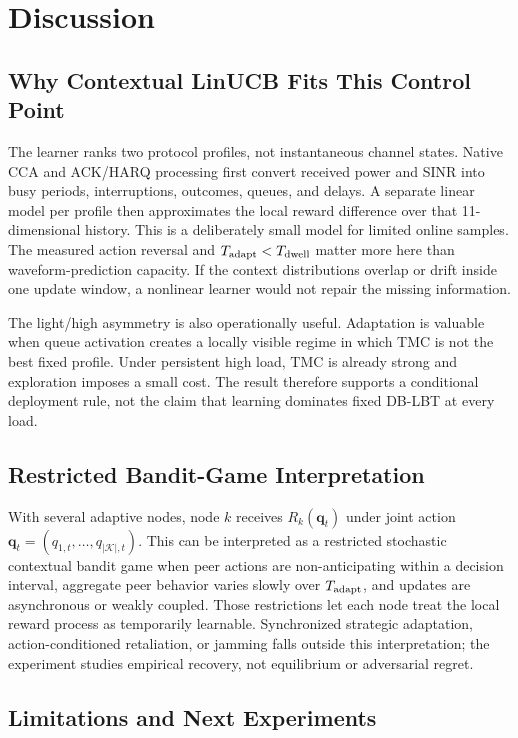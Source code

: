 \section{Discussion}
\label{sec:discussion}

\subsection{Why Contextual LinUCB Fits This Control Point}

The learner ranks two protocol profiles, not instantaneous channel states.
Native CCA and ACK/HARQ processing first convert received power and SINR into
busy periods, interruptions, outcomes, queues, and delays. A separate linear
model per profile then approximates the local reward difference over that
11-dimensional history. This is a deliberately small model for limited online
samples. The measured action reversal and
$T_{\rm adapt}<T_{\rm dwell}$ matter more here than waveform-prediction
capacity. If the context distributions overlap or drift inside one update
window, a nonlinear learner would not repair the missing information.

The light/high asymmetry is also operationally useful. Adaptation is valuable
when queue activation creates a locally visible regime in which TMC is not the
best fixed profile. Under persistent high load, TMC is already strong and
exploration imposes a small cost. The result therefore supports a conditional
deployment rule, not the claim that learning dominates fixed DB-LBT at every
load.

\subsection{Restricted Bandit-Game Interpretation}

With several adaptive nodes, node $k$ receives
$R_k(\boldsymbol q_t)$ under joint action
$\boldsymbol q_t=(q_{1,t},\ldots,q_{|\mathcal K|,t})$. This can be interpreted
as a restricted stochastic contextual bandit game when peer actions are
non-anticipating within a decision interval, aggregate peer behavior varies
slowly over $T_{\rm adapt}$, and updates are asynchronous or weakly coupled.
Those restrictions let each node treat the local reward process as temporarily
learnable. Synchronized strategic adaptation, action-conditioned retaliation,
or jamming falls outside this interpretation; the experiment studies empirical
recovery, not equilibrium or adversarial regret.

\subsection{Limitations and Next Experiments}

